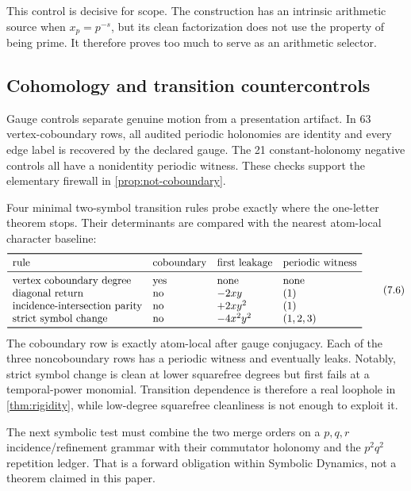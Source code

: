 This control is decisive for scope.  The construction has an intrinsic
arithmetic source when \(x_p=p^{-s}\), but its clean factorization does not
use the property of being prime.  It therefore proves too much to serve as an
arithmetic selector.

\subsection{Cohomology and transition countercontrols}

Gauge controls separate genuine motion from a presentation artifact.  In 63
vertex-coboundary rows, all audited periodic holonomies are identity and every
edge label is recovered by the declared gauge.  The 21 constant-holonomy
negative controls all have a nonidentity periodic witness.  These checks
support the elementary firewall in \cref{prop:not-coboundary}.

Four minimal two-symbol transition rules probe exactly where the one-letter
theorem stops.  Their determinants are compared with the nearest atom-local
character baseline:
\[
\begin{array}{llll}
\toprule
\text{rule}&\text{coboundary}&\text{first leakage}&\text{periodic witness}\\
\midrule
\text{vertex coboundary degree}&\text{yes}&\text{none}&\text{none}\\
\text{diagonal return}&\text{no}&-2xy&(1)\\
\text{incidence-intersection parity}&\text{no}&+2xy^2&(1)\\
\text{strict symbol change}&\text{no}&-4x^2y^2&(1,2,3)\\
\bottomrule
\end{array}
\tag{7.6}\label{7.6}
\]
The coboundary row is exactly atom-local after gauge conjugacy.  Each of the
three noncoboundary rows has a periodic witness and eventually leaks.
Notably, strict symbol change is clean at lower squarefree degrees but first
fails at a temporal-power monomial.  Transition dependence is therefore a
real loophole in \cref{thm:rigidity}, while low-degree squarefree cleanliness
is not enough to exploit it.

The next symbolic test must combine the two merge orders on a
\(p,q,r\) incidence/refinement grammar with their commutator holonomy and the
\(p^2q^2\) repetition ledger.  That is a forward obligation within Symbolic
Dynamics, not a theorem claimed in this paper.
